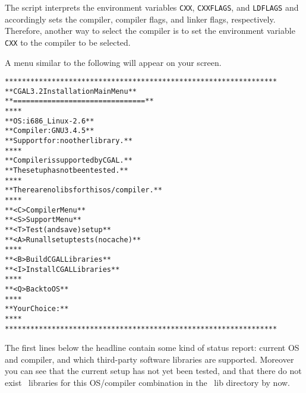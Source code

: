 The script interprets the environment variables \texttt{CXX},
\texttt{CXXFLAGS}, and \texttt{LDFLAGS} and accordingly sets the
compiler, compiler flags, and linker flags, respectively.  Therefore,
another way to select the compiler is to set the environment variable
\texttt{CXX} to the compiler to be selected.

A menu similar to the following will appear on your screen.

{\ccTexHtml{\scriptsize}{} \label{pic:main-menu}
\begin{alltt}
  ****************************************************************
  **             CGAL 3.2 Installation Main Menu                **
  **             ===============================                **
  **                                                            **
  **   OS:          i686_Linux-2.6                              **
  **   Compiler:    GNU 3.4.5                                   **
  **   Support for: no other library.                           **
  **                                                            **
  **   Compiler is supported by CGAL.                           **
  **   The setup has not been tested.                           **
  **                                                            **
  **   There are no libs for this os/compiler.                  **
  **                                                            **
  **   <C>  Compiler Menu                                       **
  **   <S>  Support Menu                                        **
  **   <T>  Test (and save) setup                               **
  **   <A>  Run all setup tests (no cache)                      **
  **                                                            **
  **   <B>  Build CGAL Libraries                                **
  **   <I>  Install CGAL Libraries                              **
  **                                                            **
  **   <Q>  Back to OS                                          **
  **                                                            **
  **   Your Choice:                                             **
  **                                                            **
  ****************************************************************
\end{alltt}}

The first lines below the headline contain some kind of status report:
current OS and compiler, and which third-party software libraries are
supported. Moreover you can see that the current setup has not yet
been tested, and that there do not exist \cgal\ libraries for this
OS/compiler combination in the \cgal\ lib directory by now.

